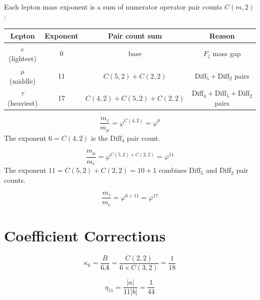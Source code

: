 Each lepton mass exponent is a sum of numerator operator pair counts $C(m,2)$:
\begin{center}
\begin{tabular}{|c|c|c|c|}
\hline
Lepton & Exponent & Pair count sum & Reason \\
\hline
$e$ (lightest) & 0 & base & $F_\zeta$ mass gap \\
$\mu$ (middle) & 11 & $C(5,2)+C(2,2)$ & $\mathrm{Diff}_5 + \mathrm{Diff}_2$ pairs \\
$\tau$ (heaviest) & 17 & $C(4,2)+C(5,2)+C(2,2)$ & $\mathrm{Diff}_4 + \mathrm{Diff}_5 + \mathrm{Diff}_2$ pairs \\
\hline
\end{tabular}
\end{center}

\begin{theorem}
\label{thm:mass_tau_mu}
\leanok
\[
\frac{m_\tau}{m_\mu} = \varphi^{C(4,2)} = \varphi^6
\]
The exponent $6 = C(4,2)$ is the $\mathrm{Diff}_4$ pair count.
\end{theorem}

\begin{theorem}
\label{thm:mass_mu_e}
\leanok
\[
\frac{m_\mu}{m_e} = \varphi^{C(5,2)+C(2,2)} = \varphi^{11}
\]
The exponent $11 = C(5,2) + C(2,2) = 10 + 1$ combines $\mathrm{Diff}_5$ and $\mathrm{Diff}_2$ pair counts.
\end{theorem}

\begin{theorem}
\label{thm:mass_tau_e}
\leanok
\[
\frac{m_\tau}{m_e} = \varphi^{6+11} = \varphi^{17}
\]
\end{theorem}

\section{Coefficient Corrections}
\label{sec:mass_corrections}

\begin{theorem}
\label{thm:mass_diff6_correction}
\leanok
\[
\kappa_6 = \frac{B}{6A} = \frac{C(2,2)}{6 \times C(3,2)} = \frac{1}{18}
\]
\end{theorem}

\begin{theorem}
\label{thm:mass_diff5_correction}
\leanok
\[
\eta_{11} = \frac{|a|}{11|b|} = \frac{1}{44}
\]
\end{theorem}

